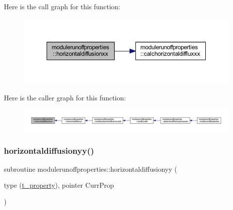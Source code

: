 Here is the call graph for this function\+:\nopagebreak
\begin{figure}[H]
\begin{center}
\leavevmode
\includegraphics[width=348pt]{namespacemodulerunoffproperties_aa14d5eb72e2b9e8e165bfbb537331410_cgraph}
\end{center}
\end{figure}
Here is the caller graph for this function\+:\nopagebreak
\begin{figure}[H]
\begin{center}
\leavevmode
\includegraphics[width=350pt]{namespacemodulerunoffproperties_aa14d5eb72e2b9e8e165bfbb537331410_icgraph}
\end{center}
\end{figure}
\mbox{\label{namespacemodulerunoffproperties_a4725654ec67f2fac23c7df49fb984a0e}} 
\subsubsection{\texorpdfstring{horizontaldiffusionyy()}{horizontaldiffusionyy()}}
{\footnotesize\ttfamily subroutine modulerunoffproperties\+::horizontaldiffusionyy (\begin{DoxyParamCaption}\item[{type (\mbox{\hyperlink{structmodulerunoffproperties_1_1t__property}{t\+\_\+property}}), pointer}]{Curr\+Prop }\end{DoxyParamCaption})\hspace{0.3cm}{\ttfamily [private]}}

